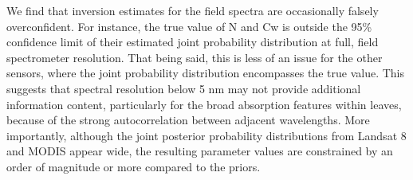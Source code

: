 We find that inversion estimates for the field spectra are occasionally falsely overconfident.
For instance, the true value of N and Cw is outside the 95\% confidence limit of their estimated joint probability distribution at full, field spectrometer resolution.
That being said, this is less of an issue for the other sensors, where the joint probability distribution encompasses the true value.
This suggests that spectral resolution below 5 nm may not provide additional information content, particularly for the broad absorption features within leaves, because of the strong autocorrelation between adjacent wavelengths.
More importantly, although the joint posterior probability distributions from Landsat 8 and MODIS appear wide, the resulting parameter values are constrained by an order of magnitude or more compared to the priors. 

